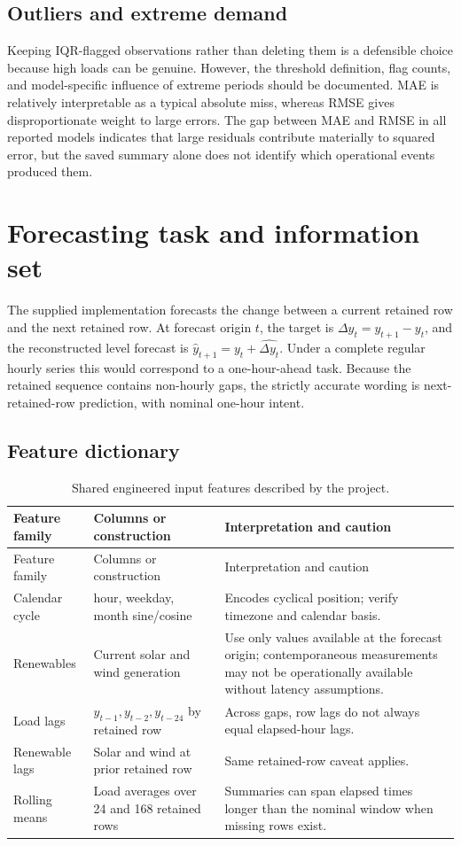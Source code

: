 \documentclass[12pt,a4paper]{article}
\begin{document}
\subsection{Outliers and extreme demand}
Keeping IQR-flagged observations rather than deleting them is a defensible choice because high loads can be genuine. However, the threshold definition, flag counts, and model-specific influence of extreme periods should be documented. MAE is relatively interpretable as a typical absolute miss, whereas RMSE gives disproportionate weight to large errors. The gap between MAE and RMSE in all reported models indicates that large residuals contribute materially to squared error, but the saved summary alone does not identify which operational events produced them.

\newpage
\section{Forecasting task and information set}
The supplied implementation forecasts the change between a current retained row and the next retained row. At forecast origin $t$, the target is $\Delta y_t=y_{t+1}-y_t$, and the reconstructed level forecast is $\hat y_{t+1}=y_t+\widehat{\Delta y_t}$. Under a complete regular hourly series this would correspond to a one-hour-ahead task. Because the retained sequence contains non-hourly gaps, the strictly accurate wording is next-retained-row prediction, with nominal one-hour intent.

\subsection{Feature dictionary}
\begin{longtable}{p{.22\linewidth}p{.32\linewidth}p{.37\linewidth}}
\caption{Shared engineered input features described by the project.}\\
\toprule Feature family & Columns or construction & Interpretation and caution \\\midrule\endfirsthead
\toprule Feature family & Columns or construction & Interpretation and caution \\\midrule\endhead
Calendar cycle & hour, weekday, month sine/cosine & Encodes cyclical position; verify timezone and calendar basis.\\
Renewables & Current solar and wind generation & Use only values available at the forecast origin; contemporaneous measurements may not be operationally available without latency assumptions.\\
Load lags & $y_{t-1}, y_{t-2}, y_{t-24}$ by retained row & Across gaps, row lags do not always equal elapsed-hour lags.\\
Renewable lags & Solar and wind at prior retained row & Same retained-row caveat applies.\\
Rolling means & Load averages over 24 and 168 retained rows & Summaries can span elapsed times longer than the nominal window when missing rows exist.\\
\bottomrule\end{longtable}
\end{document}

